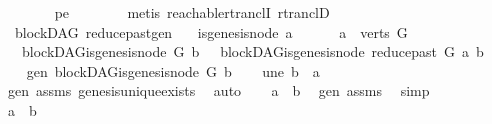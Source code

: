\begin{isabellebody}
\ \ \ \ \ \ \isamarkupfalse%
\ pe\isanewline
\ \ \ \ \ \ \isamarkupfalse%
\ {\isacharparenleft}{\kern0pt}metis\ reachable{\isacharunderscore}{\kern0pt}rtranclI\ rtranclD{\isacharparenright}{\kern0pt}\ \isanewline
\ \ \isamarkupfalse%
\isanewline
{}\isamarkupfalse%
%
\endisatagproof
{\isafoldproof}%
%
\isadelimproof
\isanewline
%
\endisadelimproof
\isanewline
\isanewline
\isanewline
{}\isamarkupfalse%
\ {\isacharparenleft}{\kern0pt}\ blockDAG{\isacharparenright}{\kern0pt}\ reduce{\isacharunderscore}{\kern0pt}past{\isacharunderscore}{\kern0pt}gen{\isacharcolon}{\kern0pt}\isanewline
\ \ \ {\isachardoublequoteopen}{\isasymnot}is{\isacharunderscore}{\kern0pt}genesis{\isacharunderscore}{\kern0pt}node\ a{\isachardoublequoteclose}\ \isanewline
\ \ \ \ \ {\isachardoublequoteopen}a\ {\isasymin}\ verts\ G{\isachardoublequoteclose}\isanewline
\ \ \ {\isachardoublequoteopen}blockDAG{\isachardot}{\kern0pt}is{\isacharunderscore}{\kern0pt}genesis{\isacharunderscore}{\kern0pt}node\ G\ b\ {\isasymLongrightarrow}\ \ blockDAG{\isachardot}{\kern0pt}is{\isacharunderscore}{\kern0pt}genesis{\isacharunderscore}{\kern0pt}node\ {\isacharparenleft}{\kern0pt}reduce{\isacharunderscore}{\kern0pt}past\ G\ a{\isacharparenright}{\kern0pt}\ b{\isachardoublequoteclose}\isanewline
%
\isadelimproof
%
\endisadelimproof
%
\isatagproof
{}\isamarkupfalse%
\ {\isacharminus}{\kern0pt}\isanewline
\ \ \isamarkupfalse%
\ gen{\isacharcolon}{\kern0pt}\ {\isachardoublequoteopen}blockDAG{\isachardot}{\kern0pt}is{\isacharunderscore}{\kern0pt}genesis{\isacharunderscore}{\kern0pt}node\ G\ b{\isachardoublequoteclose}\isanewline
\ \ \isamarkupfalse%
\ une{\isacharcolon}{\kern0pt}\ {\isachardoublequoteopen}b\ {\isasymnoteq}\ a{\isachardoublequoteclose}\ \ \isamarkupfalse%
\ gen\ assms{\isacharparenleft}{\kern0pt}{}{\isacharparenright}{\kern0pt}\ genesis{\isacharunderscore}{\kern0pt}unique{\isacharunderscore}{\kern0pt}exists\ \isamarkupfalse%
\ auto\isanewline
\ \ \isamarkupfalse%
\ {\isachardoublequoteopen}a\ {\isasymrightarrow}\isactrlsup {\isacharasterisk}{\kern0pt}\ b{\isachardoublequoteclose}\ \isamarkupfalse%
\ gen\ assms{\isacharparenleft}{\kern0pt}{}{\isacharparenright}{\kern0pt}\ \isamarkupfalse%
\ simp\ \isanewline
\ \ \isamarkupfalse%
\ \isamarkupfalse%
\ {\isachardoublequoteopen}a\ {\isasymrightarrow}\isactrlsup {\isacharplus}{\kern0pt}\ b{\isachardoublequoteclose}\ \isanewline

\end{isabellebody}
